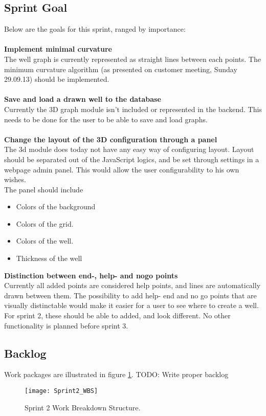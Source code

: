\documentclass{report}
\begin{document}
\subsection{Sprint Goal} \label{subsec:sprint_goal2}
Below are the goals for this sprint, ranged by importance:\\\\
\textbf{Implement minimal curvature}\\
The well graph is currently represented as straight lines between each points. The minimum curvature algorithm (as presented on customer meeting, Sunday 29.09.13) should be implemented.\\ \\
\textbf{Save and load a drawn well to the database}\\
Currently the 3D graph module isn’t included or represented in the backend. This needs to be done for the user to be able to save and load graphs.\\ \\
\textbf{Change the layout of the 3D configuration through a panel} \\
The 3d module does today not have any easy way of configuring layout. Layout should be separated out of the JavaScript logics, and be set through settings in a webpage admin panel. This would allow the user configurability to his own wishes. \\ 
The panel should include
\begin{itemize}
\item Colors of the background
\item Colors of the grid.
\item Colors of the well.
\item Thickness of the well
\end{itemize} 
\textbf{Distinction between end-, help- and nogo points}\\
Currently all added points are considered help points, and lines are automatically drawn between them. The possibility to add help- end and no go points that are visually distinctable would make it easier for a user to see where to create a well. For sprint 2, these should be able to added, and look different. No other functionality is planned before sprint 3.

\subsection{Backlog} \label{subsec:backlog2} %
Work packages are illustrated in figure \ref{fig:sprint2_WBS}.
TODO: Write proper backlog
\begin{figure}
    \centering
    \texttt{[image: Sprint2\_WBS]}
    \caption{Sprint 2 Work Breakdown Structure.   \label{fig:sprint2_WBS}}
\end{figure}
\newpage
\end{document}

